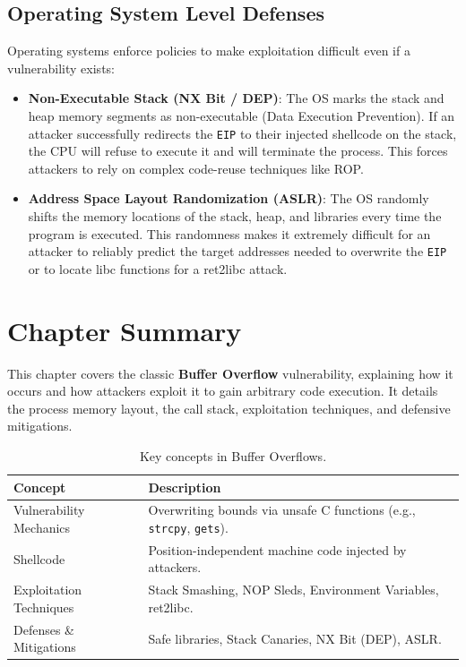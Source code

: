 \subsection{Operating System Level Defenses}
Operating systems enforce policies to make exploitation difficult even if a vulnerability exists:
\begin{itemize}
    \item \textbf{Non-Executable Stack (NX Bit / DEP)}: The OS marks the stack and heap memory segments as non-executable (Data Execution Prevention). If an attacker successfully redirects the \texttt{EIP} to their injected shellcode on the stack, the CPU will refuse to execute it and will terminate the process. This forces attackers to rely on complex code-reuse techniques like ROP.
    \item \textbf{Address Space Layout Randomization (ASLR)}: The OS randomly shifts the memory locations of the stack, heap, and libraries every time the program is executed. This randomness makes it extremely difficult for an attacker to reliably predict the target addresses needed to overwrite the \texttt{EIP} or to locate libc functions for a ret2libc attack.
\end{itemize}

\section*{Chapter Summary}

This chapter covers the classic \textbf{Buffer Overflow} vulnerability, explaining how it occurs and how attackers exploit it to gain arbitrary code execution. It details the process memory layout, the call stack, exploitation techniques, and defensive mitigations.

\begin{table}[htpb]
\centering
\begin{tabular}{|l|p{10cm}|}
\hline
\textbf{Concept} & \textbf{Description} \\ \hline
Vulnerability Mechanics & Overwriting bounds via unsafe C functions (e.g., \texttt{strcpy}, \texttt{gets}). \\ \hline
Shellcode & Position-independent machine code injected by attackers. \\ \hline
Exploitation Techniques & Stack Smashing, NOP Sleds, Environment Variables, ret2libc. \\ \hline
Defenses \& Mitigations & Safe libraries, Stack Canaries, NX Bit (DEP), ASLR. \\ \hline
\end{tabular}
\caption{Key concepts in Buffer Overflows.}
\label{tab:ch6_summary}
\end{table}
